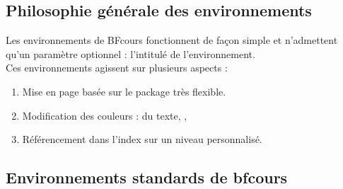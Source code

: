 \subsection{Philosophie générale des environnements}

Les environnements de BFcours fonctionnent de façon simple et n'admettent qu'un paramètre optionnel : l'intitulé de l'environnement.\\

Ces environnements agissent sur plusieurs aspects : 
\begin{enumerate}
    \item Mise en page basée sur le package  très flexible. 
    \item Modification des couleurs :  du texte, , 
    \item Référencement dans l'index sur un niveau personnalisé. 
\end{enumerate}
\subsection{Environnements standards de bfcours}


